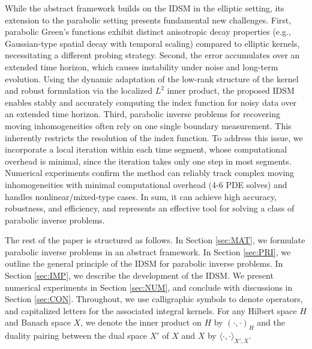 \documentclass[onefignum,onetabnum]{siamart190516}
\numberwithin{equation}{section}
\begin{document}
While the abstract framework builds on the IDSM \cite{Ito2025Iterative} in the elliptic setting, its extension to the parabolic setting presents fundamental new challenges.
First, parabolic Green's functions exhibit distinct anisotropic decay properties (e.g., Gaussian-type spatial decay with temporal scaling) compared to elliptic kernels, necessitating a different probing strategy. 
Second, the error accumulates over an extended time horizon, which causes instability under noise and long-term evolution.
Using the dynamic adaptation of the low-rank structure of the kernel and robust formulation via the localized $L^2$ inner product, the proposed IDSM enables stably and accurately computing the index function for noisy data over an extended time horizon.
Third, parabolic inverse problems for recovering moving inhomogeneities often rely on one single boundary measurement.
This inherently restricts the resolution of the index function.
To address this issue, we incorporate a local iteration within each time segment, whose computational overhead is minimal, since the iteration takes only one step in most segments.
Numerical experiments confirm the method can reliably track complex moving inhomogeneities with minimal computational overhead (4-6 PDE solves) and handles nonlinear/mixed-type cases.
In sum, it can achieve high accuracy, robustness, and efficiency, and represents an effective tool for solving a class of parabolic inverse problems.

The rest of the paper is structured as follows.
In Section \ref{sec:MAT}, we formulate parabolic inverse problems in an abstract framework.
In Section \ref{sec:PRI}, we outline the general principle of the IDSM for parabolic inverse problems.
In Section \ref{sec:IMP}, we describe the development of the IDSM.
We present numerical experiments in Section \ref{sec:NUM}, and conclude with discussions in Section \ref{sec:CON}.
Throughout, we use calligraphic symbols to denote operators, and capitalized letters for the associated integral kernels.
For any Hilbert space $H$ and Banach space $X$, we denote the inner product on $H$ by $(\cdot, \cdot)_{H}$ and the duality pairing between the dual space $X'$ of $X$ and $X$ by $\langle \cdot, \cdot \rangle_{X', X}$.
\end{document}

